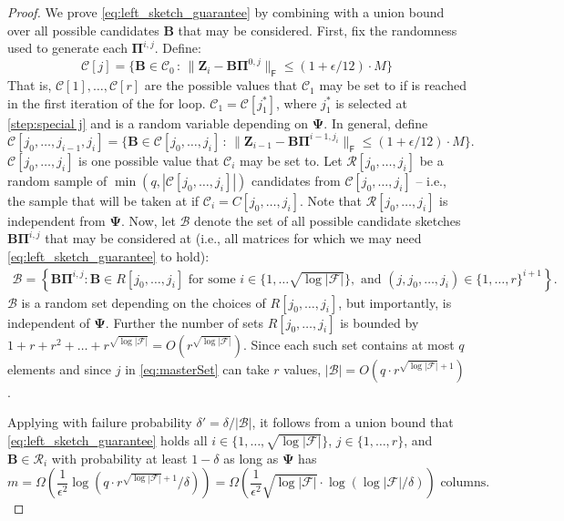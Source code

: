 \documentclass{article}[11pt]
\theoremstyle{definition}
\newcommand{\bv}[1]{\boldsymbol{\mathbf{#1}}}
\newcommand{\Fro}{\mathsf{F}}
\newcommand{\F}{\mathcal{F}}
\begin{document}
\begin{proof}
We prove \eqref{eq:left_sketch_guarantee} by combining 
 with a union bound over all possible candidates $\bv B$ that may be considered. First, fix the randomness used to generate each $\bv{\Pi}^{i,j}$. 
Define:
\[ \mathcal C[j] = \Big\{\bv B \in \mathcal{C}_0 \, : \, \|\bv{Z}_i - \bv{B}\bv{\Pi}^{0,j}\|_\Fro \leq (1+\epsilon/12)\cdot M \Big\} \]
That is, $\mathcal C[1], \ldots, \mathcal C[r]$ are the possible values that $\mathcal C_1$ may be set to if  is reached in the first iteration of the for loop. $\mathcal C_1 = \mathcal C[j^*_1]$, where $j^*_1$ is selected at \cref{step:special j} and is a random variable depending on $\bv{\Psi}$. 
In general, define
\[
\mathcal C[j_0, \ldots, j_{i-1}, j_{i}] = \Big\{\bv B \in \mathcal C[j_0, \ldots, j_i] \, : \, \|\bv{Z}_{i-1} - \bv{B}\bv{\Pi}^{i-1,j_{i}}\|_\Fro \leq (1+\epsilon/12)\cdot M \Big\}. 
\]
$\mathcal C[j_0, \ldots, j_i]$ is one possible value that $\mathcal C_{i}$ may be set to.
Let $\mathcal{R}[j_0, \ldots, j_{i}]$ be a random sample of $\min(q,|\mathcal C[j_0, \ldots, j_i]|)$ candidates from $\mathcal C[j_0, \ldots, j_i]$ -- i.e., the sample that will be taken at  if $\mathcal{C}_i = C[j_0, \ldots, j_i]$. Note that $\mathcal{R}[j_0, \ldots, j_{i}]$ is independent from $\bv{\Psi}$. Now, let $\mathcal B$ denote the set of all possible candidate sketches $\bv B \bv{\Pi}^{i,j}$ that may be considered at  (i.e., all matrices for which we may need \eqref{eq:left_sketch_guarantee} to hold):
\begin{align}\label{eq:masterSet}\mathcal B = \left \{\bv B \bv{\Pi}^{i,j} : \bv B \in {R}[j_0, \ldots, j_{i}] \text{ for some } i \in \{1,\ldots \sqrt{\log|\F|}\}, \text{ and }(j,j_0,\ldots,j_i) \in \{1,\ldots,r\}^{i+1} \right \}.
\end{align}
$\mathcal B$ is a random set depending on the choices of $R[j_0, \ldots, j_{i}]$, but importantly, is independent of $\bv \Psi$. Further the number of sets $R[j_0,\ldots,j_i]$ is bounded by $1 + r + r^2 + \ldots + r^{\sqrt{\log|\F|}}  = O\left(r^{\sqrt{\log|\F|}}\right)$. Since each such set contains at most $q$ elements and since $j$ in \eqref{eq:masterSet} can take $r$ values, $|\mathcal{B}| = O\left(q\cdot r^{\sqrt{\log|\F|}+1}\right)$.

Applying  with failure probability $\delta' = \delta/|\mathcal{B}|$, it  follows from a union bound that \eqref{eq:left_sketch_guarantee} holds all $i \in \{1, \ldots, \sqrt{\log |\F|}\}$, $j \in \{1, \ldots, r\}$, and $\bv{B} \in \mathcal{R}_{i}$ with probability at least $1 - \delta$ as long as $\bv{\Psi}$ has
\[
m = \Omega\left(\frac{1}{\epsilon^2}\log\left(q\cdot r^{\sqrt{\log|\F|} + 1}/\delta\right)\right) = \Omega\left(\frac{1}{\epsilon^2}\sqrt{\log |\F|} \cdot \log(\log |\F|/\delta) \right)
\text{ columns.}
\]


\end{proof}
\end{document}

